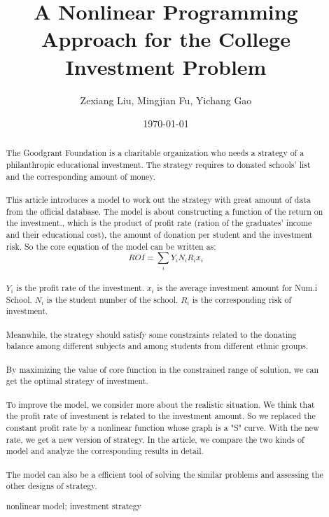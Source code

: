 \documentclass{mcmthesis}
\title{A Nonlinear Programming Approach for the College Investment Problem}
\author{Zexiang Liu, Mingjian Fu, Yichang Gao}
\date{\today}
\begin{document}
\begin{abstract}
\paragraph{} The Goodgrant Foundation is a charitable organization who needs a strategy of a philanthropic educational investment. The strategy requires to donated schools' list and the corresponding amount of money. 
\paragraph{} This article introduces a model to work out the strategy with great amount of data from the official database. The model is about constructing a function of the return on the investment., which is the product of profit rate (ration of the graduates' income and their educational cost), the amount of donation per student and the investment risk. So the core equation of the model can be written as:
\begin{equation}
ROI=\sum_i Y_i N_i R_i x_i
\end{equation}

\paragraph{} $Y_i$ is the profit rate of the investment. $x_i$ is the average investment amount for Num.i School. $N_i$ is the student number of the school. $R_i$ is the corresponding risk of investment. 
\paragraph{} Meanwhile, the strategy should satisfy some constraints related to the donating balance among different subjects and among students from different ethnic groups.
\paragraph{} By maximizing the value of core function in the constrained range of solution, we can get the optimal strategy of investment.
\paragraph{} To improve the model, we consider more about the realistic situation. We think that the profit rate of investment is related to the investment amount. So we replaced the constant profit rate by a nonlinear function whose graph is a "S" curve. With the new rate, we get a new version of strategy. In the article, we compare the two kinds of model and analyze the corresponding results in detail.
\paragraph{} The model can also be a efficient tool of solving the similar problems and assessing the other designs of strategy. 

\begin{keywords}
nonlinear model; investment strategy
\end{keywords}
\end{abstract}
\end{document}
